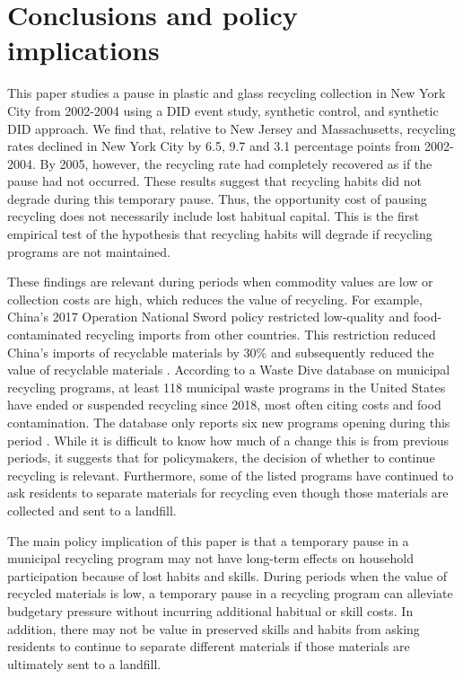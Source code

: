 \documentclass[12pt]{article}
\begin{document}
\section{Conclusions and policy implications}

This paper studies a pause in plastic and glass recycling collection in New York City from 2002-2004 using a DID event study, synthetic control, and synthetic DID approach.  We find that, relative to New Jersey and Massachusetts, recycling rates declined in New York City by 6.5, 9.7 and 3.1 percentage points from 2002-2004.  By 2005, however, the recycling rate had completely recovered as if the pause had not occurred.  These results suggest that recycling habits did not degrade during this temporary pause.  Thus, the opportunity cost of pausing recycling does not necessarily include lost habitual capital.  This is the first empirical test of the hypothesis that recycling habits will degrade if recycling programs are not maintained.

These findings are relevant during periods when commodity values are low or collection costs are high, which reduces the value of recycling.  For example, China's 2017 Operation National Sword policy restricted low-quality and food-contaminated recycling imports from other countries.  This restriction reduced China's imports of recyclable materials by 30\% \citep{linetal2023} and subsequently reduced the value of recyclable materials \citep{vedantametal2022}.  According to a Waste Dive database on municipal recycling programs, at least 118 municipal waste programs in the United States have ended or suspended recycling since 2018, most often citing costs and food contamination.  The database only reports six new programs opening during this period \citep{wastedive2023}.  While it is difficult to know how much of a change this is from previous periods, it suggests that for policymakers, the decision of whether to continue recycling is relevant.  Furthermore, some of the listed programs have continued to ask residents to separate materials for recycling even though those materials are collected and sent to a landfill.

The main policy implication of this paper is that a temporary pause in a municipal recycling program may not have long-term effects on household participation because of lost habits and skills.  During periods when the value of recycled materials is low, a temporary pause in a recycling program can alleviate budgetary pressure without incurring additional habitual or skill costs.  In addition, there may not be value in preserved skills and habits from asking residents to continue to separate different materials if those materials are ultimately sent to a landfill.
\end{document}
